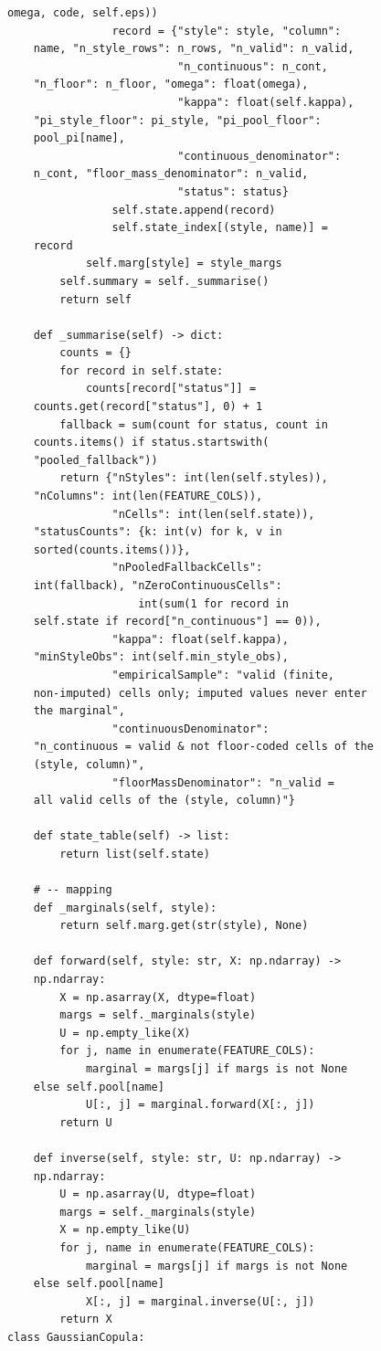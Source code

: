 \begin{multicols}{2}
\begin{Verbatim}[fontsize=\scriptsize]
    omega, code, self.eps))
                record = {"style": style, "column":
    name, "n_style_rows": n_rows, "n_valid": n_valid,
                          "n_continuous": n_cont,
    "n_floor": n_floor, "omega": float(omega),
                          "kappa": float(self.kappa),
    "pi_style_floor": pi_style, "pi_pool_floor":
    pool_pi[name],
                          "continuous_denominator":
    n_cont, "floor_mass_denominator": n_valid,
                          "status": status}
                self.state.append(record)
                self.state_index[(style, name)] =
    record
            self.marg[style] = style_margs
        self.summary = self._summarise()
        return self

    def _summarise(self) -> dict:
        counts = {}
        for record in self.state:
            counts[record["status"]] =
    counts.get(record["status"], 0) + 1
        fallback = sum(count for status, count in
    counts.items() if status.startswith(
    "pooled_fallback"))
        return {"nStyles": int(len(self.styles)),
    "nColumns": int(len(FEATURE_COLS)),
                "nCells": int(len(self.state)),
    "statusCounts": {k: int(v) for k, v in
    sorted(counts.items())},
                "nPooledFallbackCells":
    int(fallback), "nZeroContinuousCells":
                    int(sum(1 for record in
    self.state if record["n_continuous"] == 0)),
                "kappa": float(self.kappa),
    "minStyleObs": int(self.min_style_obs),
                "empiricalSample": "valid (finite,
    non-imputed) cells only; imputed values never enter
    the marginal",
                "continuousDenominator":
    "n_continuous = valid & not floor-coded cells of the
    (style, column)",
                "floorMassDenominator": "n_valid =
    all valid cells of the (style, column)"}

    def state_table(self) -> list:
        return list(self.state)

    # -- mapping
    def _marginals(self, style):
        return self.marg.get(str(style), None)

    def forward(self, style: str, X: np.ndarray) ->
    np.ndarray:
        X = np.asarray(X, dtype=float)
        margs = self._marginals(style)
        U = np.empty_like(X)
        for j, name in enumerate(FEATURE_COLS):
            marginal = margs[j] if margs is not None
    else self.pool[name]
            U[:, j] = marginal.forward(X[:, j])
        return U

    def inverse(self, style: str, U: np.ndarray) ->
    np.ndarray:
        U = np.asarray(U, dtype=float)
        margs = self._marginals(style)
        X = np.empty_like(U)
        for j, name in enumerate(FEATURE_COLS):
            marginal = margs[j] if margs is not None
    else self.pool[name]
            X[:, j] = marginal.inverse(U[:, j])
        return X
class GaussianCopula:


\end{Verbatim}
\end{multicols}
